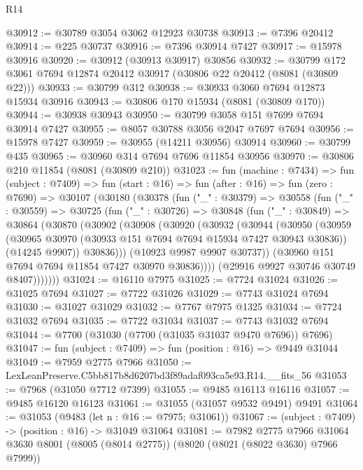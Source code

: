 \begin{lexlean}{R14}
\begin{coremodule}
@30912 := @30789 @3054 @3062 @12923 @30738
@30913 := @7396 @20412
@30914 := @225 @30737
@30916 := @7396 @30914 @7427
@30917 := @15978 @30916
@30920 := @30912 (@30913 @30917) @30856
@30932 := @30799 @172 @3061 @7694 @12874 @20412 @30917 (@30806 @22 @20412 (@8081 (@30809 @22)))
@30933 := @30799 @312
@30938 := @30933 @3060 @7694 @12873 @15934 @30916
@30943 := @30806 @170 @15934 (@8081 (@30809 @170))
@30944 := @30938 @30943
@30950 := @30799 @3058 @151 @7699 @7694 @30914 @7427
@30955 := @8057 @30788 @3056 @2047 @7697 @7694
@30956 := @15978 @7427
@30959 := @30955 (@14211 @30956) @30914
@30960 := @30799 @435
@30965 := @30960 @314 @7694 @7696 @11854 @30956
@30970 := @30806 @210 @11854 (@8081 (@30809 @210))
@31023 := fun (machine : @7434) =>
  fun (subject : @7409) =>
  fun (start : @16) =>
  fun (after : @16) =>
  fun (zero : @7690) =>
  @30107
    (@30180
      (@30378
        (fun ("_" : @30379) =>
        @30558
          (fun ("_" : @30559) =>
          @30725
            (fun ("_" : @30726) =>
            @30848
              (fun ("_" : @30849) =>
              @30864
                (@30870
                  (@30902
                    (@30908
                      (@30920
                        (@30932
                          (@30944
                            (@30950
                              (@30959
                                (@30965 @30970 (@30933 @151 @7694 @7694 @15934 @7427 @30943 @30836))
                                (@14245 @9907))
                              @30836)))
                        (@10923 @9987 @9907 @30737))
                      (@30960 @151 @7694 @7694 @11854 @7427 @30970 @30836))))
                (@29916 @9927 @30746 @30749 @8407)))))))
@31024 := @16110 @7975
@31025 := @7724 @31024
@31026 := @31025 @7694
@31027 := @7722 @31026
@31029 := @7743 @31024 @7694
@31030 := @31027 @31029
@31032 := @7767 @7975 @1325
@31034 := @7724 @31032 @7694
@31035 := @7722 @31034
@31037 := @7743 @31032 @7694
@31044 := @7700 (@31030 (@7700 (@31035 @31037 @9470 @7696)) @7696)
@31047 := fun (subject : @7409) => fun (position : @16) => @9449 @31044
@31049 := @7959 @2775 @7966
@31050 := LexLeanPreserve.C5bb817b8d6207bd3f89adaf093ca5e93.R14.__fits_56
@31053 := @7968 (@31050 @7712 @7399)
@31055 := @9485 @16113 @16116
@31057 := @9485 @16120 @16123
@31061 := @31055 (@31057 @9532 @9491) @9491
@31064 := @31053 (@9483 (let n : @16 := @7975; @31061))
@31067 := (subject : @7409) -> (position : @16) -> @31049 @31064
@31081 := @7982
    @2775
    @7966
    @31064
    @3630
    @8001
    (@8005 (@8014 @2775))
    (@8020 (@8021 (@8022 @3630) @7966 @7999))

\end{coremodule}
\end{lexlean}
